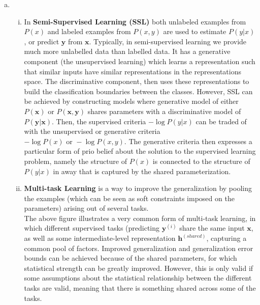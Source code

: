 \documentclass[fleqn]{article}
\begin{document}
\begin{enumerate}[a)]
	\item
	\begin{enumerate}[i)]
		\item 
		In \textbf{Semi-Supervised Learning (SSL)} both unlabeled examples from $P(x)$ and labeled examples from $P(x, y)$ are used to estimate $P(y|x)$, or predict $\bm{y}$ from $\bm{x}$.
		Typically, in semi-supervised learning we provide much more unlabelled data than labelled data. It has a generative component (the unsupervised learning) which learns a representation such that similar inputs have similar representations in the representations space. The discriminative component, then uses these representations to build the classification boundaries between the classes.
		However, SSL can be achieved by constructing models where generative model of either $P(\bm{x})$ or $P(\bm{x, y})$ shares parameters with a discriminative model of $P(\bm{y|x})$. Then, the supervised criteria $-\log P(y|x)$ can be traded of with the unsupervised or generative criteria $-\log P(x) \text{ or } -\log P(x, y)$. The generative criteria then expresses a particular form of prio belief about the solution to the supervised learning problem, namely the structure of $P(x)$ is connected to the structure of $P(y|x)$ in away that is captured by the shared parameterization.
		\item 
		\textbf{Multi-task Learning} is a way to improve the generalization by pooling the examples (which can be seen as soft constraints imposed on the parameters) arising out of several tasks.
		\vspace{40mm} \\
		The above figure illustrates a very common form of multi-task learning, in which different supervised tasks (predicting $\bm{y}^{(i)}$ share the same input $\bm{x}$, as well as some intermediate-level representation $\bm{h}^{(shared)}$, capturing a common pool of factors. Improved generalization and generalization error bounds can be achieved because of the shared parameters, for which statistical strength can be greatly improved. However, this is only valid if some assumptions about the statistical relationship between the different tasks are valid, meaning that there is something shared across some of the tasks. 
		

\end{enumerate}
\end{enumerate}
\end{document}
